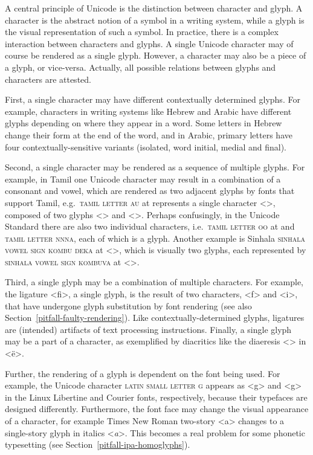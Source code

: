 A central principle of Unicode is the distinction between character and glyph. A
character is the abstract notion of a symbol in a writing system, while a glyph
is the visual representation of such a symbol. In practice, there is a complex
interaction between characters and glyphs. A single Unicode character may of
course be rendered as a single glyph. However, a character may also be a piece
of a glyph, or vice-versa. Actually, all possible relations between glyphs and
characters are attested.

First, a single character may have different contextually determined glyphs. For
example, characters in writing systems like Hebrew and Arabic have different
glyphs depending on where they appear in a word. Some letters in Hebrew change
their form at the end of the word, and in Arabic, primary letters have four
contextually-sensitive variants (isolated, word initial, medial and final).

Second, a single character may be rendered as a sequence of multiple glyphs. For
example, in Tamil one Unicode character may result in a combination of a
consonant and vowel, which are rendered as two adjacent glyphs by fonts that
support Tamil, e.g.\ \textsc{tamil letter au} at  represents a single 
character <>, composed of two glyphs <> and <>. Perhaps confusingly, 
in the Unicode Standard there are also two individual characters, 
i.e.\ \textsc{tamil letter oo} at  and 
 \textsc{tamil letter nnna}, each of which is a glyph. Another example is 
Sinhala \textsc{sinhala vowel sign kombu deka} at  <>, which is 
visually two glyphs, each represented by \textsc{sinhala vowel sign kombuva} 
at  <>.

Third, a single glyph may be a combination of multiple characters. For example, 
the ligature <ﬁ>, a single glyph, is the result of two
characters, <f> and <i>, that have undergone glyph substitution by font
rendering (see also Section~\ref{pitfall-faulty-rendering}). Like
contextually-determined glyphs, ligatures are (intended) artifacts of text
processing instructions. Finally, a single glyph may be a part of a
character, as exemplified by diacritics like the diaeresis <> in <ë>.

Further, the rendering of a glyph is dependent on the font being used. For
example, the Unicode character \textsc{latin small letter g} appears as <g> and
<{g}> in the Linux Libertine and Courier fonts, respectively,
because their typefaces are designed differently. Furthermore, the font face may
change the visual appearance of a character, for example Times New Roman
two-story <{a}> changes to a single-story glyph in italics
<\emph{a}>. This becomes a real problem for some
phonetic typesetting (see Section~\ref{pitfall-ipa-homoglyphs}).


